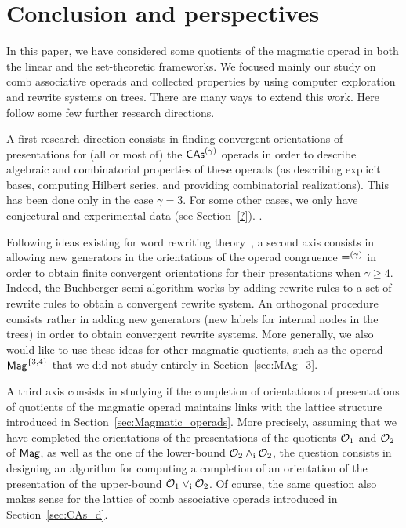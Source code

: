 \section*{Conclusion and perspectives}
In this paper, we have considered some quotients of the magmatic operad
in both the linear and the set-theoretic frameworks. We focused mainly
our study on comb associative operads and collected properties by
using computer exploration and rewrite systems on trees. There are many
ways to extend this work. Here follow some few further research
directions.
\medbreak

A first research direction consists in finding convergent orientations
of presentations for (all or most of) the $\mathsf{CAs}^{\left(\gamma\right)}$ operads in
order to describe algebraic and combinatorial properties of these
operads (as describing explicit bases, computing Hilbert
series, and providing combinatorial realizations). This has been
done only in the case $\gamma = 3$. For some other cases, we only have
conjectural and experimental data (see Section~\ref{?}).
.
\medbreak

Following ideas existing for word rewriting theory~\cite{GGM15}, a
second axis consists in allowing new generators in the orientations of
the operad congruence $\operatorname{\equiv}^{(\gamma)}$ in order to obtain finite
convergent orientations for their presentations when $\gamma \geq 4$.
Indeed, the Buchberger semi-algorithm works by adding rewrite rules to a
set of rewrite rules to obtain a convergent rewrite system. An orthogonal
procedure consists rather in adding new generators (new labels for
internal nodes in the trees) in order to obtain convergent rewrite
systems. More generally, we also would like to use these ideas for other
magmatic quotients, such as the operad $\mathsf{Mag}^{\{3, 4\}}$ that we did not
study entirely in Section~\ref{sec:MAg_3}.
\medbreak

A third axis consists in studying if the completion of orientations of
presentations of quotients of the magmatic operad maintains links with
the lattice structure introduced in Section~\ref{sec:Magmatic_operads}.
More precisely, assuming that we have completed the orientations of
the presentations of the quotients $\mathcal{O}_1$ and $\mathcal{O}_2$ of $\mathsf{Mag}$,
as well as the one of the lower-bound $\mathcal{O}_2 \wedge_{\mathrm{i}} \mathcal{O}_2$, the
question consists in designing an algorithm for computing a completion
of an orientation of the presentation of the upper-bound
$\mathcal{O}_1 \vee_{\mathrm{i}} \mathcal{O}_2$. Of course, the same question also makes sense
for the lattice of comb associative operads introduced in
Section~\ref{sec:CAs_d}.
\medbreak

